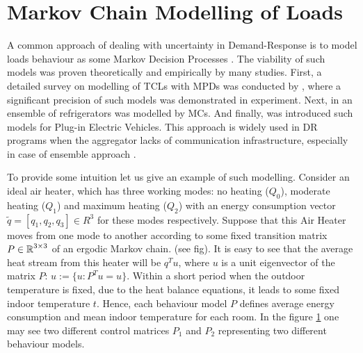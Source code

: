 \section{Markov Chain Modelling of Loads}
\label{section:markov_devices}


A common approach of dealing with uncertainty in Demand-Response is to model loads behaviour as some Markov Decision Processes . The viability of such models was proven theoretically and empirically by many studies. First, a detailed survey on modelling of TCLs with MPDs was conducted by \cite{Koch2011}, where a significant precision of such models was demonstrated in experiment. Next, in \cite{Trovato2015} an ensemble of refrigerators was modelled by MCs. And finally, \cite{Wu2016} was introduced such models for Plug-in Electric Vehicles. This approach is widely used in DR programs when the aggregator lacks of communication infrastructure, especially in case of ensemble approach \cite{Chertkov2017}. 

To provide some intuition let us give an example of such modelling. Consider an ideal air heater, which has three working modes: no heating ($Q_0$), moderate heating ($Q_1$) and maximum heating ($Q_2$) with an energy consumption vector $\widetilde{q} = [q_1, q_2, q_3] \in R^3$ for these modes respectively. Suppose that this Air Heater moves from one mode to another according to some fixed transition matrix $P \in \operatorname{\mathbb{R}}^{3 \times 3}$ of an ergodic Markov chain. (see fig). It is easy to see that the average heat stream from this heater will be $q^Tu$, where $u$ is a unit eigenvector of the matrix $P$: $u := \{u : P^Tu = u\}$. Within a short period when the outdoor temperature is fixed, due to the heat balance equations, it leads to some fixed indoor temperature $t$. Hence, each behaviour model $P$ defines average energy consumption and mean indoor temperature for each room. In the figure \ref{fig:matrices_example} one may see two different control matrices $P_1$ and $P_2$ representing two different behaviour models. 

\begin{figure}[h!]
    \centering
    \label{fig:matrices_example}
\end{figure} 